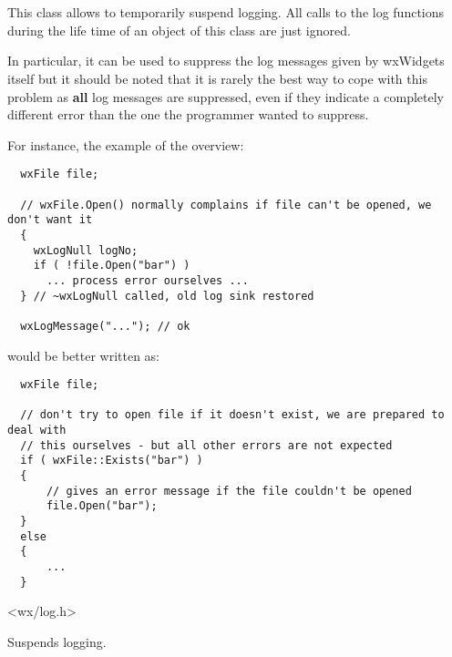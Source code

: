 
\section{}\label{wxlognull}

This class allows to temporarily suspend logging. All calls to the log
functions during the life time of an object of this class are just ignored.

In particular, it can be used to suppress the log messages given by wxWidgets
itself but it should be noted that it is rarely the best way to cope with this
problem as {\bf all} log messages are suppressed, even if they indicate a
completely different error than the one the programmer wanted to suppress.

For instance, the example of the overview:

{\small
\begin{verbatim}
  wxFile file;

  // wxFile.Open() normally complains if file can't be opened, we don't want it
  {
    wxLogNull logNo;
    if ( !file.Open("bar") )
      ... process error ourselves ...
  } // ~wxLogNull called, old log sink restored

  wxLogMessage("..."); // ok
\end{verbatim}
}%

would be better written as:

{\small
\begin{verbatim}
  wxFile file;

  // don't try to open file if it doesn't exist, we are prepared to deal with
  // this ourselves - but all other errors are not expected
  if ( wxFile::Exists("bar") )
  {
      // gives an error message if the file couldn't be opened
      file.Open("bar");
  }
  else
  {
      ...
  }
\end{verbatim}
}%




<wx/log.h>


\label{wxlognullctor}


Suspends logging.

